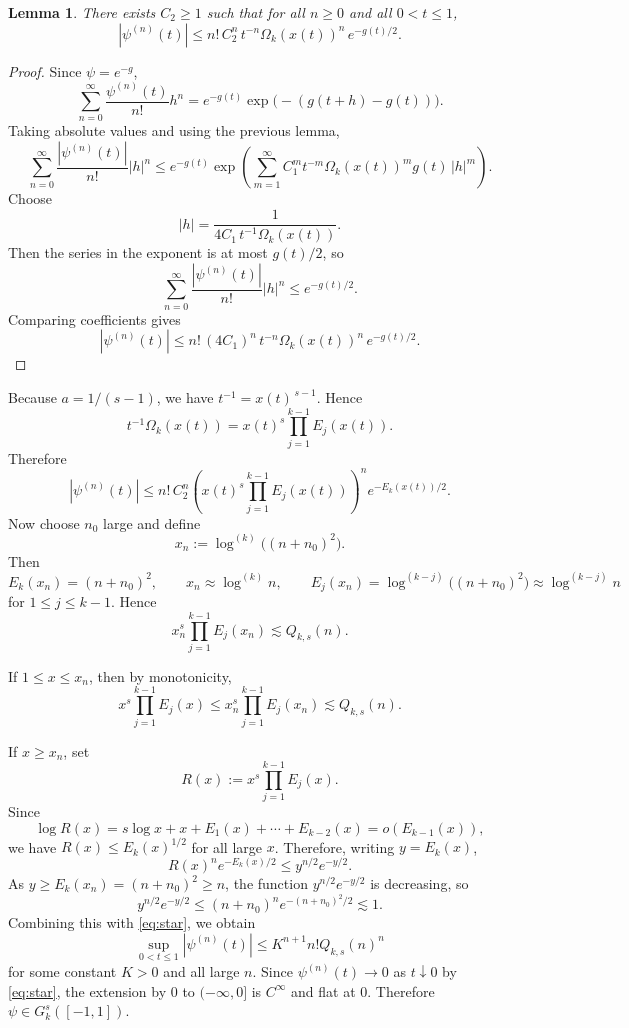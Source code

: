 \documentclass[11pt]{amsart}
\newtheorem{lemma}[theorem]{Lemma}
\newcommand{\ls}{\lesssim}
\newcommand{\1}{{\rm 1\hspace*{-0.4ex}%
			\rule{0.1ex}{1.52ex}\hspace*{0.2ex}}}
\numberwithin{equation}{section}
\begin{document}
\begin{lemma}
	There exists \(C_2\ge 1\) such that for all \(n\ge 0\) and all \(0<t\le 1\),
	\[
	|\psi^{(n)}(t)|
	\le
	n!\,C_2^n\,t^{-n}\Omega_k(x(t))^n\,e^{-g(t)/2}.
	\]
\end{lemma}

\begin{proof}
	Since \(\psi=e^{-g}\),
	\[
	\sum_{n=0}^\infty \frac{\psi^{(n)}(t)}{n!}h^n
	=
	e^{-g(t)}\exp\!\bigl(-(g(t+h)-g(t))\bigr).
	\]
	Taking absolute values and using the previous lemma,
	\[
	\sum_{n=0}^\infty \frac{|\psi^{(n)}(t)|}{n!}|h|^n
	\le
	e^{-g(t)}
	\exp\!\left(
	\sum_{m=1}^\infty C_1^m t^{-m}\Omega_k(x(t))^m g(t)\,|h|^m
	\right).
	\]
	Choose
	\[
	|h|=\frac1{4C_1\,t^{-1}\Omega_k(x(t))}.
	\]
	Then the series in the exponent is at most \(g(t)/2\), so
	\[
	\sum_{n=0}^\infty \frac{|\psi^{(n)}(t)|}{n!}|h|^n
	\le e^{-g(t)/2}.
	\]
	Comparing coefficients gives
	\[
	|\psi^{(n)}(t)|
	\le
	n!\,(4C_1)^n\,t^{-n}\Omega_k(x(t))^n\,e^{-g(t)/2}.
	\]
\end{proof}

Because \(a=1/(s-1)\), we have \(t^{-1}=x(t)^{\,s-1}\). Hence
\[
t^{-1}\Omega_k(x(t))
=
x(t)^s \prod_{j=1}^{k-1}E_j(x(t)).
\]
Therefore
\begin{equation}\label{eq:star}
	|\psi^{(n)}(t)|
	\le
	n!\,C_2^n
	\left(
	x(t)^s\prod_{j=1}^{k-1}E_j(x(t))
	\right)^n
	e^{-E_k(x(t))/2}.
\end{equation}
Now choose $n_0$ large and define
\[
x_n:=\log^{(k)}\bigl((n+n_0)^2\bigr).
\]
Then
\[
E_k(x_n)=(n+n_0)^2,
\qquad
x_n\approx \log^{(k)}n,
\qquad
E_j(x_n)=\log^{(k-j)}\bigl((n+n_0)^2\bigr)\approx \log^{(k-j)}n
\]
for $1\le j\le k-1$. Hence
\[
x_n^s\prod_{j=1}^{k-1}E_j(x_n)\lesssim Q_{k,s}(n).
\]

If $1\le x\le x_n$, then by monotonicity,
\[
x^s\prod_{j=1}^{k-1}E_j(x)\le x_n^s\prod_{j=1}^{k-1}E_j(x_n)\lesssim Q_{k,s}(n).
\]

If $x\ge x_n$, set
\[
R(x):=x^s\prod_{j=1}^{k-1}E_j(x).
\]
Since
\[
\log R(x)=s\log x+x+E_1(x)+\cdots+E_{k-2}(x)=o(E_{k-1}(x)),
\]
we have $R(x)\le E_k(x)^{1/2}$ for all large $x$. Therefore, writing $y=E_k(x)$,
\[
R(x)^n e^{-E_k(x)/2}\le y^{n/2}e^{-y/2}.
\]
As $y\ge E_k(x_n)=(n+n_0)^2\ge n$, the function $y^{n/2}e^{-y/2}$ is decreasing, so
\[
y^{n/2}e^{-y/2}\le (n+n_0)^n e^{-(n+n_0)^2/2}\ls1.
\]
Combining this with \eqref{eq:star}, we obtain
\[
\sup_{0<t\le 1}|\psi^{(n)}(t)|\le K^{n+1} n!Q_{k,s}(n)^n
\]
for some constant $K>0$ and all large $n$. Since \(\psi^{(n)}(t)\to 0\) as
\(t\downarrow 0\) by \eqref{eq:star}, the extension by \(0\) to \((-\infty,0]\) is
\(C^\infty\) and flat at \(0\). Therefore \(\psi\in G_k^s([-1,1])\).
\end{document}
